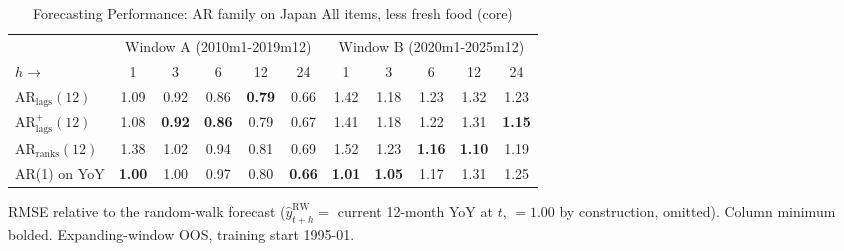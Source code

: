 \begin{table}[htbp]
\centering
\caption{Forecasting Performance: AR family on Japan All items, less fresh food (core)}
\label{tab:ar_horizon_corecpi}
\begin{tabular}{lcccccccccc}
\toprule
 & \multicolumn{5}{c}{Window A (2010m1-2019m12)} & \multicolumn{5}{c}{Window B (2020m1-2025m12)} \\
\cmidrule(lr){2-6} \cmidrule(lr){7-11}
$h \to$ & 1 & 3 & 6 & 12 & 24 & 1 & 3 & 6 & 12 & 24 \\
\midrule
$\text{AR}_{\text{lags}}(12)$ & 1.09 & 0.92 & 0.86 & \textbf{0.79} & 0.66 & 1.42 & 1.18 & 1.23 & 1.32 & 1.23 \\
$\text{AR}^{+}_{\text{lags}}(12)$ & 1.08 & \textbf{0.92} & \textbf{0.86} & 0.79 & 0.67 & 1.41 & 1.18 & 1.22 & 1.31 & \textbf{1.15} \\
$\text{AR}_{\text{ranks}}(12)$ & 1.38 & 1.02 & 0.94 & 0.81 & 0.69 & 1.52 & 1.23 & \textbf{1.16} & \textbf{1.10} & 1.19 \\
AR(1) on YoY & \textbf{1.00} & 1.00 & 0.97 & 0.80 & \textbf{0.66} & \textbf{1.01} & \textbf{1.05} & 1.17 & 1.31 & 1.25 \\
\bottomrule
\end{tabular}
\begin{tablenotes}\footnotesize\item RMSE relative to the random-walk forecast ($\hat{y}^{\text{RW}}_{t+h} = $ current 12-month YoY at $t$, $=1.00$ by construction, omitted). Column minimum bolded. Expanding-window OOS, training start 1995-01.\end{tablenotes}
\end{table}
